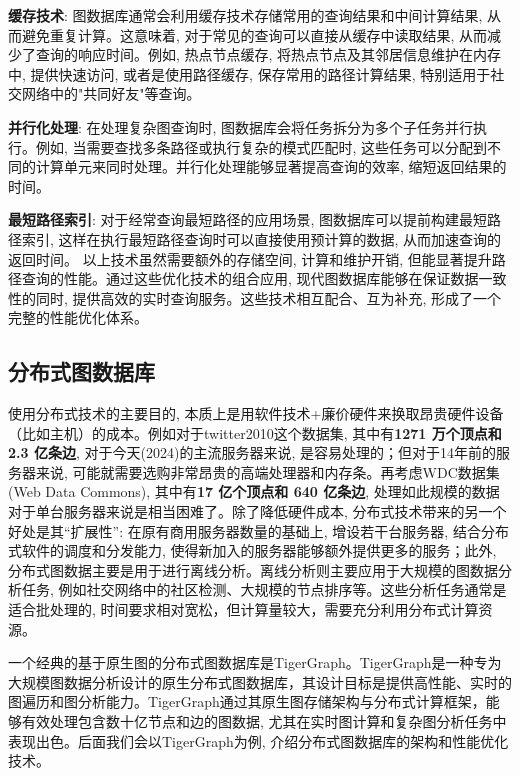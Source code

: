 \textbf{缓存技术}: 图数据库通常会利用缓存技术存储常用的查询结果和中间计算结果, 从而避免重复计算。这意味着, 对于常见的查询可以直接从缓存中读取结果, 从而减少了查询的响应时间。例如, 热点节点缓存, 将热点节点及其邻居信息维护在内存中, 提供快速访问, 或者是使用路径缓存, 保存常用的路径计算结果, 特别适用于社交网络中的"共同好友"等查询。


\textbf{并行化处理}: 在处理复杂图查询时, 图数据库会将任务拆分为多个子任务并行执行。例如, 当需要查找多条路径或执行复杂的模式匹配时, 这些任务可以分配到不同的计算单元来同时处理。并行化处理能够显著提高查询的效率, 缩短返回结果的时间。

\textbf{最短路径索引}: 对于经常查询最短路径的应用场景, 图数据库可以提前构建最短路径索引, 这样在执行最短路径查询时可以直接使用预计算的数据, 从而加速查询的返回时间。
以上技术虽然需要额外的存储空间, 计算和维护开销, 但能显著提升路径查询的性能。通过这些优化技术的组合应用, 现代图数据库能够在保证数据一致性的同时, 提供高效的实时查询服务。这些技术相互配合、互为补充, 形成了一个完整的性能优化体系。


\subsection{分布式图数据库}

使用分布式技术的主要目的, 本质上是用软件技术+廉价硬件来换取昂贵硬件设备（比如主机）的成本。例如对于twitter2010这个数据集, 其中有\textbf{1271 万个顶点和 2.3 亿条边}, 对于今天(2024)的主流服务器来说, 是容易处理的；但对于14年前的服务器来说, 可能就需要选购非常昂贵的高端处理器和内存条。再考虑WDC数据集(Web Data Commons), 其中有\textbf{17 亿个顶点和 640 亿条边}, 处理如此规模的数据对于单台服务器来说是相当困难了。除了降低硬件成本, 分布式技术带来的另一个好处是其“扩展性”: 在原有商用服务器数量的基础上, 增设若干台服务器, 结合分布式软件的调度和分发能力, 使得新加入的服务器能够额外提供更多的服务；此外, 分布式图数据主要是用于进行离线分析。离线分析则主要应用于大规模的图数据分析任务, 例如社交网络中的社区检测、大规模的节点排序等。这些分析任务通常是适合批处理的, 时间要求相对宽松，但计算量较大，需要充分利用分布式计算资源。

一个经典的基于原生图的分布式图数据库是TigerGraph。TigerGraph是一种专为大规模图数据分析设计的原生分布式图数据库，其设计目标是提供高性能、实时的图遍历和图分析能力。TigerGraph通过其原生图存储架构与分布式计算框架，能够有效处理包含数十亿节点和边的图数据, 尤其在实时图计算和复杂图分析任务中表现出色。后面我们会以TigerGraph为例, 介绍分布式图数据库的架构和性能优化技术。

